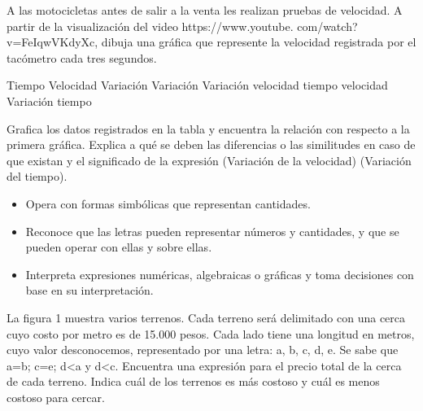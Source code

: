 \ejemplo

A las motocicletas antes de salir a la venta les realizan pruebas de velocidad. A partir de la visualización del video https://www.youtube. com/watch?v=FeIqwVKdyXc, dibuja una gráfica que represente la velocidad registrada por el tacómetro cada tres segundos.

Tiempo Velocidad Variación Variación Variación velocidad tiempo velocidad Variación tiempo



Grafica los datos registrados en la tabla y encuentra la relación con respecto a la primera gráfica. Explica a qué se deben las diferencias o las similitudes en caso de que existan y el significado de la expresión (Variación de la velocidad) (Variación del tiempo).


\evidencias

\begin{itemize}
  \item Opera con formas simbólicas que representan cantidades.
  \item Reconoce que las letras pueden representar números y cantidades, y que se pueden operar con ellas y sobre ellas.
  \item Interpreta expresiones numéricas, algebraicas o gráficas y toma decisiones con base en su interpretación.
\end{itemize}

\ejemplo

La figura 1 muestra varios terrenos. Cada terreno será delimitado con una cerca cuyo costo por metro es de 15.000 pesos. Cada lado tiene una longitud en metros, cuyo valor desconocemos, representado por una letra: a, b, c, d, e. Se sabe que a=b; c=e; d<a y d<c. Encuentra una expresión para el precio total de la cerca de cada terreno. Indica cuál de los terrenos es más costoso y cuál es menos costoso para cercar.



